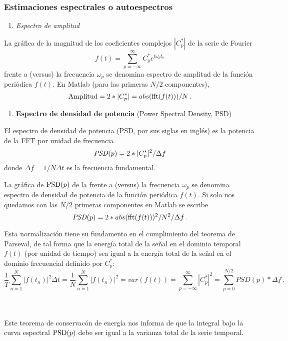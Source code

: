 \documentclass[
]{agujournal2019}
\providecommand{\tightlist}{%
  \setlength{\itemsep}{0pt}\setlength{\parskip}{0pt}}\usepackage{longtable,booktabs,array}
\begin{document}
\vspace{0.25cm}

\hypertarget{estimaciones-espectrales-o-autoespectros}{%
\subsubsection{Estimaciones espectrales o
autoespectros}\label{estimaciones-espectrales-o-autoespectros}}

\vspace{0.5cm}

\begin{enumerate}
\def\labelenumi{(\arabic{enumi})}
\tightlist
\item
  \emph{Espectro de amplitud}
\end{enumerate}

La gráfica de la magnitud de los coeficientes complejos \(|C_p^*|\) de
la serie de Fourier
\[f(t)=\sum\limits^\infty_{p=-\infty} C^*_p e^{i\omega_p t_n}\] frente a
(versus) la frecuencia \(\omega_p\) se denomina espectro de amplitud de
la función periódica \(f(t)\). En Matlab (para las primeras \(N/2\)
componentes), \[{\rm Amplitud}=2*|C^*_p|=abs({\rm fft}(f(t)))/N\,.\]

\vspace{0.5cm}

\begin{enumerate}
\def\labelenumi{(\arabic{enumi})}
\setcounter{enumi}{1}
\tightlist
\item
  \textbf{Espectro de densidad de potencia} (Power Spectral Density,
  PSD)
\end{enumerate}

El espectro de densidad de potencia (PSD, por sus siglas en inglés) es
la potencia de la FFT por unidad de frecuencia
\[{\it PSD}(p)=2*|C^*_p|^2/\Delta f\] donde \(\Delta f=1/N\Delta t\) es
la frecuencia fundamental.

La gráfica de \({\rm PSD}(p)\) de la frente a (versus) la frecuencia
\(\omega_p\) se denomina espectro de densidad de potencia de la función
periódica \(f(t)\). Si solo nos quedamos con las \(N/2\) primeras
componentes en Matlab se escribe
\[{\it PSD}(p)=2*abs({\rm fft}(f(t)))^2/N^2/\Delta f\,.\]

Esta normalización tiene su fundamento en el cumplimiento del teorema de
Parseval, de tal forma que la energía total de la señal en el dominio
temporal \(f(t)\) (por unidad de tiempo) sea igual a la energía total de
la señal en el dominio frecuencial definido por \(C^*_p\):
\[\frac{1}{T}\sum\limits^N_{n=1}|f(t_n)|^2 \Delta t =\frac{1}{N}\sum\limits^N_{n=1}|f(t_n)|^2 =
var(f(t))=\sum\limits^{\infty}_{p=-\infty} |C^*_p|^2=\sum\limits^{N/2}_{p=0}PSD(p)*\Delta f\,.\]\\
\strut \\
Este teorema de conservacón de energía nos informa de que la integral
bajo la curva espectral \({\rm PSD}(p)\) debe ser igual a la varianza
total de la serie temporal.
\end{document}
